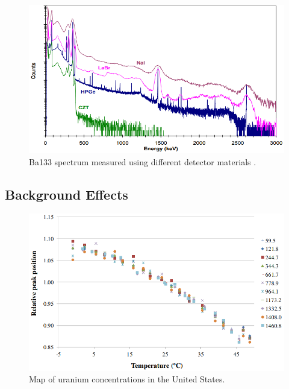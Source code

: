\begin{figure}[H]
\centering
\includegraphics[width=0.95\linewidth]{images/Ba133_spectrum_different_detector_materials_Market_Survey_Report}
\caption{Ba133 spectrum measured using different detector materials \cite{RIIDMarketSurveyReport}.}
\label{fig:Ba133_spectrum_different_detector_materials_Market_Survey_Report}
\end{figure}


\subsection{Background Effects}



\begin{figure}[H]
\centering
\includegraphics[width=0.95\linewidth]{images/temp_vs_relative_peak_position_CASANOVAS2012588}
\caption{Map of uranium concentrations in the United States.}
\label{fig:uranium_concentration}
\end{figure}


